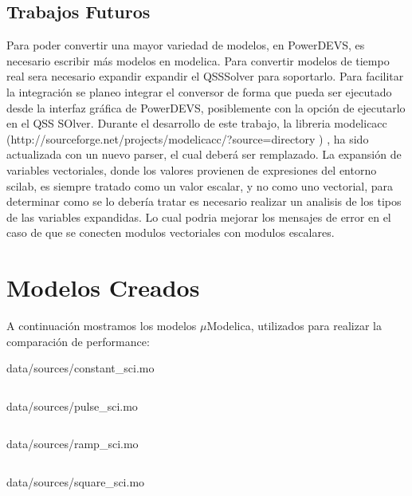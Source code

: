 \documentclass[a4paper,	11pt]{report}
\begin{document}
\section{Trabajos Futuros}
Para poder convertir una mayor variedad de modelos, en PowerDEVS, es necesario escribir más modelos en modelica.
Para convertir modelos de tiempo real sera necesario expandir expandir el QSSSolver para soportarlo.
Para facilitar la integración se planeo integrar el conversor de forma que pueda ser ejecutado desde la interfaz gráfica de PowerDEVS, posiblemente con la opción de ejecutarlo en el QSS SOlver.
Durante el desarrollo de este trabajo, la libreria modelicacc (http://sourceforge.net/projects/modelicacc/?source=directory ) , ha sido actualizada con un nuevo parser, el cual deberá ser remplazado.
La expansión de variables vectoriales, donde los valores provienen de expresiones del entorno scilab, es siempre tratado como un valor escalar, y no como uno vectorial, para determinar como se lo debería tratar es necesario realizar un analisis de los tipos de las variables expandidas. Lo cual podria mejorar los mensajes de error en el caso de que se conecten modulos vectoriales con modulos escalares.

\appendix
\chapter{Modelos Creados}
A continuación mostramos los modelos $\mu$Modelica, utilizados para realizar la comparación de performance:

\begin{listing}[H]    
     \caption{data/sources/constant\_sci.mo}    
     \inputminted{modelica}{../../data/sources/constant_sci.mo}
     \label{lst:constant_sci.mo}
\end{listing} 

\begin{listing}[H]    
	\caption{data/sources/pulse\_sci.mo}
	\inputminted{modelica}{../../data/sources/pulse_sci.mo}
	\label{lst:pulse_sci.mo}
\end{listing} 
\begin{listing}[H]    
	\caption{data/sources/ramp\_sci.mo}
	\inputminted{modelica}{../../data/sources/ramp_sci.mo}
	\label{lst:ramp_sci.mo}
\end{listing} 
\begin{listing}[H]    
	\caption{data/sources/square\_sci.mo}
	\inputminted{modelica}{../../data/sources/square_sci.mo}
	\label{lst:square_sci.mo}
\end{listing} 
\end{document}
